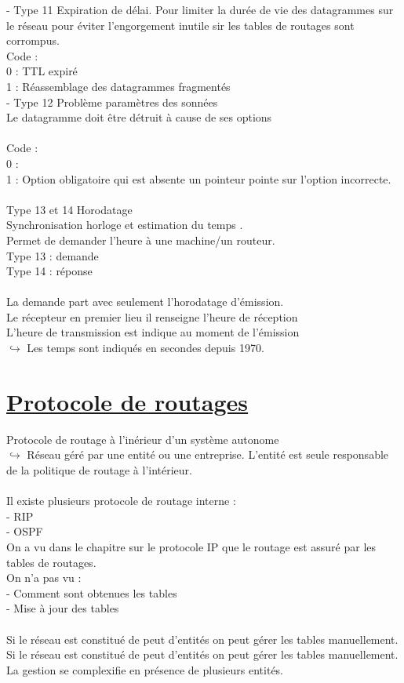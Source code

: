\documentclass{article}
\begin{document}
- Type 11 Expiration de délai.
Pour limiter la durée de vie des datagrammes sur le réseau pour éviter l'engorgement inutile sir les tables de routages sont corrompus.
\\
Code : \\ 
0 : TTL expiré \\
1 : Réassemblage des datagrammes fragmentés 
\\
- Type 12 Problème paramètres des sonnées \\
Le datagramme doit être détruit à cause de ses options\\
\\

Code : \\
0 : \\
1 : Option obligatoire qui est absente un pointeur pointe sur l'option incorrecte. \\

\\

Type 13 et 14 Horodatage \\
Synchronisation horloge et estimation du temps . \\
Permet de demander l'heure à une machine/un routeur. \\
Type 13 : demande \\
Type 14 : réponse \\
\\
La demande part avec seulement l'horodatage d'émission. \\
Le récepteur en premier lieu il renseigne l'heure de réception \\
L'heure de transmission est indique au moment de l'émission \\
$\hookrightarrow$ Les temps sont indiqués en secondes depuis 1970. 
\section{\underline{Protocole de routages}}
Protocole de routage à l'inérieur d'un système autonome \\
$\hookrightarrow$ Réseau géré par une entité ou une entreprise. L'entité est seule responsable de la politique de routage à l'intérieur.\\
\\
Il existe plusieurs protocole de routage interne : \\
- RIP \\
- OSPF \\
\newpage
On a vu dans le chapitre sur le protocole IP que le routage est assuré par les tables de routages. \\
On n'a pas vu : \\
- Comment sont obtenues les tables \\
- Mise à jour des tables \\
\\
Si le réseau est constitué de peut d'entités on peut gérer les tables manuellement.
\\
Si le réseau est constitué de peut d'entités on peut gérer les tables manuellement. \\
La gestion se complexifie en présence de plusieurs entités. 
\end{document}
